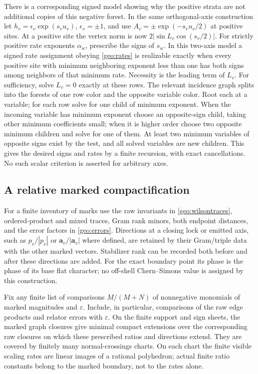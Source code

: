 There is a corresponding signed model showing why the positive strata are not additional copies of this negative forest. In the same orthogonal-axis construction let
\(h_v=\epsilon_v\exp(s_vu_v)\), \(\epsilon_v=\pm1\), and use \(A_v=\pm\exp(-s_vu_v/2)\) at positive sites. At a positive site the vertex norm is now
\(2|\sin L_v\cos(s_v/2)|\). For strictly positive rate exponents \(\alpha_w\), prescribe the signs of \(s_w\). In this two-axis model a signed rate assignment obeying \eqref{geo:rates} is realizable exactly when every positive site with minimum neighboring exponent less than one has both signs among neighbors of that minimum rate. Necessity is the leading term of \(L_v\). For sufficiency, solve \(L_v=0\) exactly at these rows. The relevant incidence graph splits into the forests of one row color and the opposite variable color. Root each at a variable; for each row solve for one child of minimum exponent. When the incoming variable has minimum exponent choose an opposite-sign child, taking other minimum coefficients small; when it is higher order choose two opposite minimum children and solve for one of them. At least two minimum variables of opposite signs exist by the test, and all solved variables are new children. This gives the desired signs and rates by a finite recursion, with exact cancellations. No such scalar criterion is asserted for arbitrary axes.

\subsection{A relative marked compactification}
For a finite inventory of marks use the raw invariants in \eqref{geo:wilsontraces}, ordered-product and mixed traces, Gram rank minors, both endpoint distances, and the error factors in \eqref{geo:errors}. Directions at a closing lock or emitted axis, such as \(p_v/|p_v|\) or \(\mathbf a_v/|\mathbf a_v|\) where defined, are retained by their Gram/triple data with the other marked vectors. Stabilizer rank can be recorded both before and after these directions are added. For the exact boundary point its phase is the phase of its base flat character; no off-shell Chern--Simons value is assigned by this construction.

\begin{proposition}\label{geo:compactification}
Fix any finite list of comparisons \(M/(M+N)\) of nonnegative monomials of marked magnitudes and \(\varepsilon\). Include, in particular, comparisons of the raw edge products and relator errors with \(\varepsilon\). On the finite support and sign sheets, the marked graph closures give minimal compact extensions over the corresponding raw closures on which these prescribed ratios and directions extend. They are covered by finitely many normal-crossings charts. On each chart the finite visible scaling rates are linear images of a rational polyhedron; actual finite ratio constants belong to the marked boundary, not to the rates alone.
\end{proposition}

